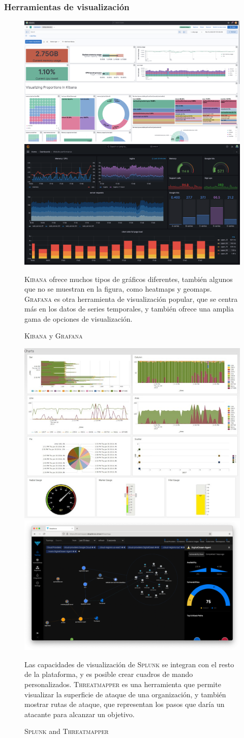 \subsubsection{Herramientas de visualización}
\begin{figure}[htbp]
   \centering
   \includegraphics[width=0.49\columnwidth]{images/kibana.png}
   \includegraphics[width=0.49\columnwidth]{images/grafana.png}
   \caption{\textsc{Kibana} y \textsc{Grafana}}
   \label{fig:kibana}

   \textsc{Kibana} ofrece muchos tipos de gráficos diferentes, también algunos que no se muestran en la figura, como heatmaps y geomaps. \textsc{Grafana} es otra herramienta de visualización popular, que se centra más en los datos de series temporales, y también ofrece una amplia gama de opciones de visualización. 
\end{figure}

\begin{figure}[htbp]
   \centering
   \includegraphics[width=0.49\columnwidth]{images/splunk.jpg}
   \includegraphics[width=0.49\columnwidth]{images/threatmapper.png}
   \caption{\textsc{Splunk} and \textsc{Threatmapper}}
   \label{fig:splunk}
   Las capacidades de visualización de \textsc{Splunk} se integran con el resto de la plataforma, y es posible crear cuadros de mando personalizados. \textsc{Threatmapper} es una herramienta que permite visualizar la superficie de ataque de una organización, y también mostrar rutas de ataque, que representan los pasos que daría un atacante para alcanzar un objetivo.
\end{figure}

